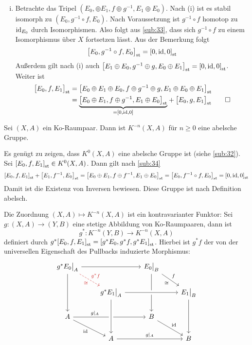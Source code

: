 \begin{beweis}
\begin{enumerate}[(i)]
	\item Betrachte das Tripel $(E_0, \oplus E_1, f \oplus g ^{-1}, E_1 \oplus E_0)$. Nach (i) ist es stabil isomorph zu $(E_0, g ^{-1}\circ f,E_0)$. Nach Voraussetzung ist
	$g ^{-1} \circ f$ homotop zu $\id_{E_0}$ durch Isomorphismen. Also folgt aus \autoref{sub:33}, dass sich $g ^{-1} \circ f$ zu einem Isomorphismus über $X$ fortsetzen 
	lässt. Aus der Bemerkung folgt 
	\begin{align*}
		\benbrace*{E_0, g ^{-1} \circ f,E_0}_\st = \benbrace*{0,\id,0}_\st 
	\end{align*}
	Außerdem gilt nach (i) auch $\benbrace*{E_1 \oplus E_0, g ^{-1} \oplus g, E_0 \oplus E_1}_\st = \benbrace*{0,\id,0}_\st$. Weiter ist
	\begin{align*}
		\benbrace[\big]{E_0,f,E_1}_\st &= \benbrace*{E_0 \oplus E_1 \oplus E_0, f \oplus g ^{-1} \oplus g, E_1 \oplus E_0 \oplus E_1}_\st \\  
		&= \Underbrace{\benbrace*{E_0 \oplus E_1, f \oplus g ^{-1}, E_1 \oplus E_0}_\st }{=\benbrace{0,\id,0}} + \benbrace[\big]{E_0,g,E_1}_\st \qedhere
	\end{align*}
\end{enumerate}
\end{beweis}


\begin{korollar}[label=sub:35]
Sei $(X,A)$ ein Ko-Raumpaar. Dann ist $K^{-n}(X,A)$ für $n \ge 0$ eine abelsche Gruppe.
\end{korollar}
\begin{beweis}
Es genügt zu zeigen, dass $K^0(X,A)$ eine abelsche Gruppe ist (siehe \autoref{sub:32}). Sei $\benbrace*{E_0, f,E_1}_\st\in K^0(X,A)$. Dann gilt nach \autoref{sub:34}
\begin{align*}
	\benbrace*{E_0,f,E_1}_\st + \benbrace*{E_1,f ^{-1},E_0}_\st = \benbrace*{E_0 \oplus E_1, f \oplus f ^{-1}, E_1 \oplus E_0}_\st = \benbrace*{E_0, f ^{-1} \circ f,E_0}_\st
	= \benbrace*{0,\id,0}_\st 
\end{align*}
Damit ist die Existenz von Inversen bewiesen. Diese Gruppe ist nach Definition abelsch.
\end{beweis}
Die Zuordnung $(X,A) \mapsto K^{-n}(X,A)$ ist ein kontravarianter Funktor: Sei $g \colon (X,A) \to (Y,B)$ eine stetige Abbildung von Ko-Raumpaaren, dann ist
\[
	g^* \colon K^{-n}(Y,B) \to K^{-n}(X,A)
\]
definiert durch $g^* \benbrace*{E_0,f,E_1}_\st = \benbrace*{g^* E_0, g^* f, g^* E_1}_\st$. Hierbei ist $g^* f$ der von der universellen Eigenschaft des Pullbacks induzierte 
Morphismus:
\[
	\begin{tikzcd}[thick]
		g^* E_0\big|_A \ar[rr] \ar[dd] \ar[dr,dashed,"g^* f","\cong"',Firebrick3] & & E_0\big|_B \drar["f","\cong"'] \ar[dd]\\
		& g^* E_1\big|_A \ar[rr,crossing over] & & E_1\big|_B \ar[dd]\\
		A \ar[rr,"g|_A",pos=0.3] \ar[dr,"\id"']& & B \ar[dr,"\id"]\\
		& A \ar[from=uu,crossing over] \ar[rr,"g|_A"]& & B
	\end{tikzcd}
\]	

